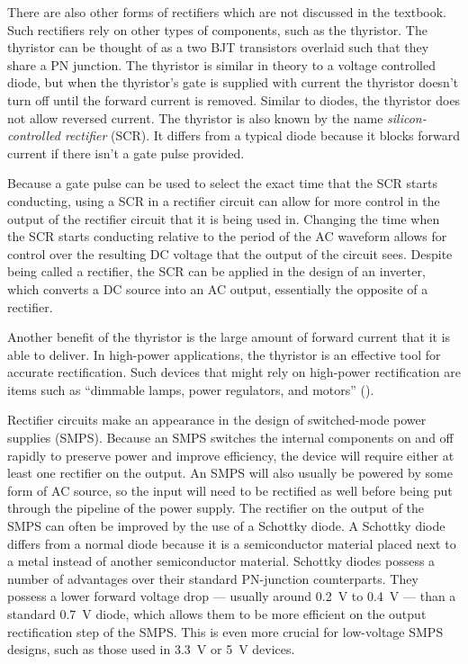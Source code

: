 
There are also other forms of rectifiers which are not
discussed in the textbook. Such rectifiers rely on other
types of components, such as the thyristor. The thyristor
can be thought of as a two BJT transistors overlaid
such that they share a PN junction. The thyristor is
similar in theory to a voltage controlled diode, but
when the thyristor's gate is supplied with current the
thyristor doesn't turn off until the forward current
is removed. Similar to diodes, the thyristor does not
allow reversed current. The thyristor is also known
by the name \emph{silicon-controlled rectifier} (SCR).
It differs from a typical diode because it blocks forward
current if there isn't a gate pulse provided.

Because a gate pulse can be used to select the exact
time that the SCR starts conducting, using a SCR in
a rectifier circuit can allow for more control in the
output of the rectifier circuit that it is being used
in. Changing the time when the SCR starts conducting
relative to the period of the AC waveform allows for
control over the resulting DC voltage that the output
of the circuit sees. Despite being called a rectifier,
the SCR can be applied in the design of an inverter,
which converts a DC source into an AC output, essentially
the opposite of a rectifier.

Another benefit of the thyristor is the large amount
of forward current that it is able to deliver. In high-power
applications, the thyristor is an effective tool for
accurate rectification. Such devices that might rely on
high-power rectification are items such as ``dimmable lamps,
power regulators, and motors'' (\cite{thyristorapplications}). 

Rectifier circuits make an appearance in the design
of switched-mode power supplies (SMPS). Because an SMPS
switches the internal components on and off rapidly
to preserve power and improve efficiency, the device
will require either at least one rectifier on the output.
An SMPS will also usually be powered by some form of
AC source, so the input will need to be rectified as
well before being put through the pipeline of the power
supply. The rectifier on the output of the SMPS can
often be improved by the use of a Schottky diode. A
Schottky diode differs from a normal diode because it
is a semiconductor material placed next to a metal instead
of another semiconductor material. Schottky diodes possess
a number of advantages over their standard PN-junction
counterparts. They possess a lower forward voltage drop
--- usually around 0.2~V to 0.4~V --- than a standard
0.7~V diode, which allows them to be more efficient
on the output rectification step of the SMPS. This is
even more crucial for low-voltage SMPS designs, such
as those used in 3.3~V or 5~V devices.

